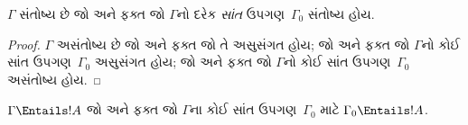 \documentclass[../../../include/open-logic-section]{subfiles}
\begin{document}
\begin{prop}[સઘનતા પ્રમેય]
$\Gamma$ સંતોષ્ય છે જો અને ફક્ત જો $\Gamma$નો દરેક
\emph{સાંત} ઉપગણ~$\Gamma_0$ સંતોષ્ય હોય.
\end{prop}

\begin{proof}
$\Gamma$ અસંતોષ્ય છે જો અને ફક્ત જો તે અસુસંગત હોય;
જો અને ફક્ત જો $\Gamma$નો કોઈ સાંત ઉપગણ~$\Gamma_0$
અસુસંગત હોય; જો અને ફક્ત જો $\Gamma$નો કોઈ સાંત
ઉપગણ~$\Gamma_0$ અસંતોષ્ય હોય.
\end{proof}

\begin{cor}
$\Gamma \Entails !A$ જો અને ફક્ત જો $\Gamma$ના
કોઈ સાંત ઉપગણ~$\Gamma_0$ માટે $\Gamma_0 \Entails !A$.
\end{cor}
\end{document}
